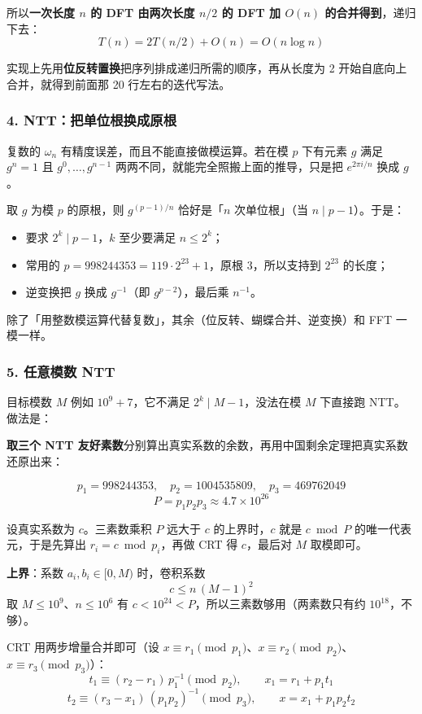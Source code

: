 所以\textbf{一次长度 $n$ 的 DFT 由两次长度 $n/2$ 的 DFT 加 $O(n)$ 的合并得到}，递归下去：
$$T(n)=2T(n/2)+O(n)=O(n\log n)$$

实现上先用\textbf{位反转置换}把序列排成递归所需的顺序，再从长度为 2 开始自底向上合并，就得到前面那 20 行左右的迭代写法。

\subsubsection*{4. NTT：把单位根换成原根}

复数的 $\omega_n$ 有精度误差，而且不能直接做模运算。若在模 $p$ 下有元素 $g$ 满足 $g^{n}=1$ 且 $g^0,\dots,g^{n-1}$ 两两不同，就能完全照搬上面的推导，只是把 $e^{2\pi i/n}$ 换成 $g$。

取 $g$ 为模 $p$ 的原根，则 $g^{(p-1)/n}$ 恰好是「$n$ 次单位根」（当 $n\mid p-1$）。于是：

\begin{itemize}
    \item 要求 $2^k\mid p-1$，$k$ 至少要满足 $n\le 2^k$；
    \item 常用的 $p=998244353=119\cdot2^{23}+1$，原根 $3$，所以支持到 $2^{23}$ 的长度；
    \item 逆变换把 $g$ 换成 $g^{-1}$（即 $g^{p-2}$），最后乘 $n^{-1}$。
\end{itemize}

除了「用整数模运算代替复数」，其余（位反转、蝴蝶合并、逆变换）和 FFT 一模一样。

\subsubsection*{5. 任意模数 NTT}

目标模数 $M$ 例如 $10^9+7$，它不满足 $2^k\mid M-1$，没法在模 $M$ 下直接跑 NTT。做法是：

\textbf{取三个 NTT 友好素数}分别算出真实系数的余数，再用中国剩余定理把真实系数还原出来：

$$p_1=998244353,\quad p_2=1004535809,\quad p_3=469762049$$
$$P=p_1p_2p_3\approx4.7\times10^{26}$$

设真实系数为 $c$。三素数乘积 $P$ 远大于 $c$ 的上界时，$c$ 就是 $c\bmod P$ 的唯一代表元，于是先算出 $r_i=c\bmod p_i$，再做 CRT 得 $c$，最后对 $M$ 取模即可。

\textbf{上界}：系数 $a_i,b_i\in[0,M)$ 时，卷积系数
$$c\le n\,(M-1)^2$$
取 $M\le10^9$、$n\le10^6$ 有 $c<10^{24}<P$，所以三素数够用（两素数只有约 $10^{18}$，不够）。

CRT 用两步增量合并即可（设 $x\equiv r_1\pmod{p_1}$、$x\equiv r_2\pmod{p_2}$、$x\equiv r_3\pmod{p_3}$）：
$$t_1\equiv(r_2-r_1)\,p_1^{-1}\pmod{p_2},\qquad x_1=r_1+p_1t_1$$
$$t_2\equiv(r_3-x_1)\,(p_1p_2)^{-1}\pmod{p_3},\qquad x=x_1+p_1p_2t_2$$

